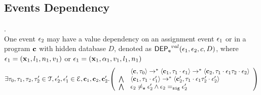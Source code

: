 %
%
%
\subsection{Events Dependency}
%
%
\begin{defn}
\label{def:event_valdep}.
\\
One event $\mathtt{\epsilon}_2$ may have a value dependency on an assignment event $\mathtt{\epsilon}_1$ or 
in a program ${\boldsymbol{\mathbf{c}}}$
with hidden database $D$, denoted as 
%
$\mathsf{DEP_{\mathtt{e}}}^{val}(\mathtt{\epsilon}_1, \mathtt{\epsilon}_2, c, D)$, where $\mathtt{\epsilon}_1 = ({\boldsymbol{\mathbf{x}}}_1, l_1, n_1, v_1) $ or 
$\mathtt{\epsilon}_1 = ({\boldsymbol{\mathbf{x}}}_1, \alpha_1, v_1, l_1, n_1)$
%
\[
\exists \vtrace_0,
\vtrace_1, \vtrace_2, \vtrace_2' \in \mathcal{T}, \event_2', \event_1' \in \eventset, \ssa{c}_1, \ssa{c}_2,  \ssa{c}_2'.
  \left(
  \begin{array}{ll}   
 & \config{\ssa{c}, \vtrace_0} \rightarrow^{*} 
\config{\ssa{c}_1, \vtrace_1 \cdot \event_1}  \rightarrow^{*} 
  \config{\ssa{c}_2,  \vtrace_1 \cdot \event_1 \vtrace_2 \cdot \event_2 } 
 \\ 
 \bigwedge &
  \config{\ssa{c}_1, \vtrace_1 \cdot \event_1'}  \rightarrow^{*} 
  \config{\ssa{c}_2',  \vtrace_1 \cdot \event_1 \vtrace_2' \cdot \event_2' } 
\\
\bigwedge &
\event_2 \eventneq \event_2' \land \event_2 \sigeq \event_2'
\end{array}
\right)
 \]
%
\end{defn}
%
